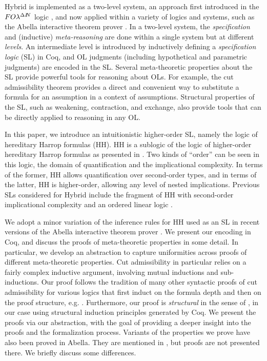 Hybrid is implemented as a two-level system, an approach first introduced in the $FO\lambda^{\Delta I\!\!N}$ logic \cite{McDowellMiller:TOCL01}, and now applied within a variety of logics and systems, such as the Abella interactive theorem prover \cite{Gacek:IJCAR08}.  In a two-level system, the \emph{specification} and (inductive) \emph{meta-reasoning} are done within a single system but at different \emph{levels}. An intermediate level is introduced by inductively defining a \emph{specification logic} (SL) in Coq, and OL judgments (including hypothetical and parametric judgments) are encoded in the SL.  Several meta-theoretic properties about the SL provide powerful tools for reasoning about OLs.  For example, the cut admissibility theorem provides a direct and convenient way to substitute a formula for an assumption in a context of assumptions.  Structural properties of the SL, such as weakening, contraction, and exchange, also provide tools that can be directly applied to reasoning in any OL.

%
In this paper, we introduce an intuitionistic higher-order SL, namely the logic of hereditary Harrop formulas (HH).  HH is a sublogic of the logic of higher-order hereditary Harrop formulas as presented in \cite{LProlog}.  Two kinds of ``order'' can be seen in this logic, the domain of quantification and the implicational complexity.  In terms of the former, HH allows quantification over second-order types, and in terms of the latter, HH is higher-order, allowing any level of nested implications.  Previous SLs considered for Hybrid include the fragment of HH with second-order implicational complexity and an ordered linear logic \cite{FeltyMomigliano:JAR10}.

We adopt a minor variation of the inference rules for HH used as an SL in recent versions of the Abella interactive theorem prover \cite{WCGN:PPDP13}.  We present our encoding in Coq, and discuss the proofs of meta-theoretic properties in some detail.  In particular, we develop an abstraction to capture uniformities across proofs of different meta-theoretic properties.  Cut admissibility in particular relies on a fairly complex inductive argument, involving mutual inductions and sub-inductions.  Our proof follows the tradition of many other syntactic proofs of cut admissibility for various logics that first induct on the formula depth and then on the proof structure, e.g. \cite{Girard89}.  Furthermore, our proof is \emph{structural} in the sense of \cite{Pfenning:IC00}, in our case using structural induction principles generated by Coq. %
We present the proofs via our abstraction, with the goal of providing a deeper insight into the proofs and the formalization process.  Variants of the properties we prove have also been proved in Abella. They are mentioned in \cite{WCGN:PPDP13}, but proofs are not presented there.  We briefly discuss some differences.

